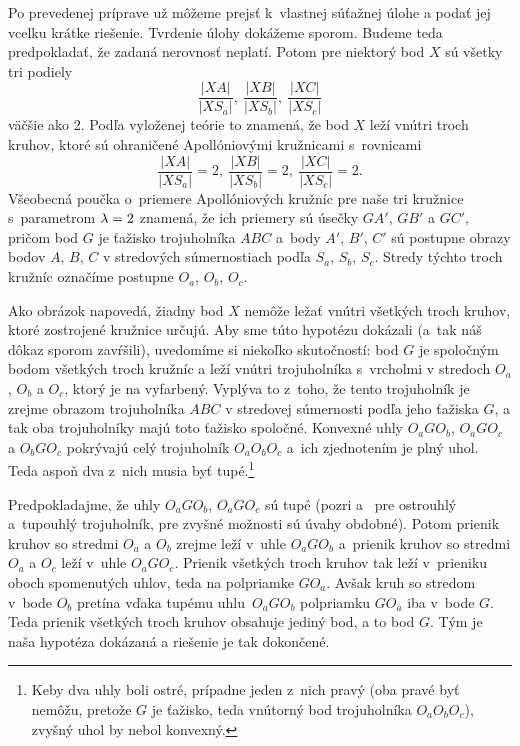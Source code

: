 {Po prevedenej príprave už môžeme prejsť k~vlastnej súťažnej úlohe
a podať jej vcelku krátke riešenie. Tvrdenie úlohy dokážeme sporom.
Budeme teda predpokladať, že zadaná nerovnosť neplatí. Potom pre
niektorý bod $X$ sú všetky tri podiely
$$
\frac{|XA|}{|XS_a|},\ \frac{|XB|}{|XS_b|},\ \frac{|XC|}{|XS_c|}
$$
väčšie ako 2. Podľa vyloženej teórie to znamená, že bod $X$ leží
vnútri troch kruhov, ktoré sú ohraničené Apollóniovými kružnicami
s~rovnicami
$$
\frac{|XA|}{|XS_a|}=2,\ \frac{|XB|}{|XS_b|}=2,\
\frac{|XC|}{|XS_c|}=2.
$$
Všeobecná poučka o~priemere Apollóniových kružníc pre naše tri
kružnice s~parametrom $\lambda=2$ znamená, že ich priemery sú
úsečky $GA'$, $GB'$ a $GC'$, pričom bod $G$ je ťažisko trojuholníka $ABC$ a~body $A'$, $B'$, $C'$ sú postupne
obrazy bodov $A$, $B$, $C$ v stredových súmernostiach podľa
$S_a$, $S_b$, $S_c$. Stredy týchto troch kružníc označíme postupne
$O_a$, $O_b$, $O_c$.
%

Ako obrázok napovedá, žiadny bod $X$ nemôže ležať vnútri všetkých
troch kruhov, ktoré zostrojené kružnice určujú. Aby sme túto
hypotézu dokázali (a~tak náš dôkaz sporom zavŕšili), uvedomíme si
niekoľko skutočností: bod $G$ je spoločným bodom všetkých troch kružníc a
leží vnútri trojuholníka s~vrcholmi v stredoch $O_a$, $O_b$ a $O_c$,
ktorý je na \obr{} vyfarbený. Vyplýva to z~toho, že tento trojuholník je
zrejme obrazom trojuholníka $ABC$ v stredovej súmernosti
podľa jeho ťažiska $G$, a tak oba trojuholníky majú toto ťažisko spoločné.
Konvexné uhly $O_a G O_b$, $O_a G O_c$ a $O_b G O_c$ pokrývajú celý trojuholník $O_aO_bO_c$ a~ich zjednotením je plný uhol. Teda aspoň dva z~nich musia byť tupé.\footnote{Keby dva uhly boli ostré, prípadne jeden z~nich pravý (oba pravé byť nemôžu, pretože $G$ je ťažisko, teda vnútorný bod trojuholníka $O_aO_bO_c$), zvyšný uhol by nebol konvexný.}
\inspsc{a70i_4.2}{0.8333}%

Predpokladajme, že uhly $O_a G O_b$, $O_a G O_c$ sú tupé (pozri  a~\obr{} pre ostrouhlý a~tupouhlý trojuholník, pre zvyšné možnosti sú úvahy obdobné). Potom prienik kruhov so stredmi $O_a$ a $O_b$ zrejme leží v~uhle $O_a G O_b$ a~prienik kruhov so stredmi $O_a$ a $O_c$ leží v~uhle $O_a G O_c$. Prienik všetkých troch kruhov tak leží v~prieniku oboch spomenutých uhlov, teda na polpriamke $GO_a$. Avšak kruh so stredom v~bode $O_b$ pretína vďaka tupému uhlu~$O_a G O_b$ polpriamku $GO_a$ iba v~bode $G$. Teda prienik všetkých troch kruhov obsahuje jediný bod, a to bod $G$. Tým je naša hypotéza dokázaná a riešenie je tak dokončené.

}

